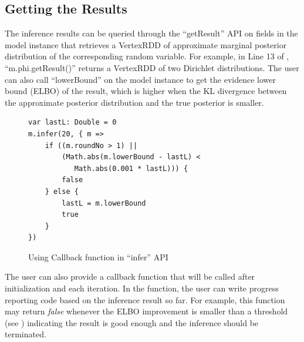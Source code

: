 \subsection{Getting the Results}
The inference results can be queried through the ``{\sf getResult}''
API on fields in the model instance that retrieves a VertexRDD of approximate
marginal posterior distribution of the corresponding random variable. For
example, in Line 13 of , ``{\sf m.phi.getResult()}'' 
returns a VertexRDD of two Dirichlet distributions. 
The user can also call ``{\sf lowerBound}'' 
on the model instance to get the evidence lower bound (ELBO) of the result, 
which is higher when the KL divergence between the approximate posterior 
distribution and the true posterior is smaller. 

\begin{figure}[h]
\centering
\begin{lstlisting}
var lastL: Double = 0
m.infer(20, { m =>
	if ((m.roundNo > 1) || 
		(Math.abs(m.lowerBound - lastL) < 
		   Math.abs(0.001 * lastL))) {
		false
	} else {
		lastL = m.lowerBound
		true	
	}
})
\end{lstlisting}
\caption{Using Callback function in ``infer'' API}
\label{fig:two_coins_callback}
\end{figure}

The user can also provide a callback function that will be called after
initialization and each iteration. In the function, the user can write
progress reporting code based on the inference result so far. 
For example, this function may return {\em false} whenever
the ELBO improvement is smaller than a threshold 
(see ) indicating the result is good enough 
and the inference should be terminated. 



